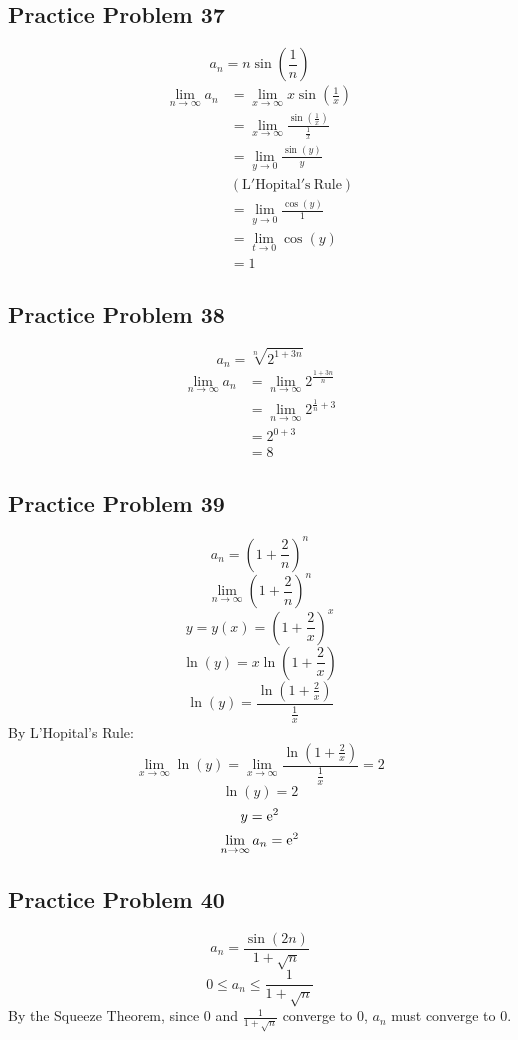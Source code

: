 \documentclass{math}
\begin{document}
\subsection*{Practice Problem 37}
\[ a_{n} = n\sin(\frac{1}{n}) \]
\begin{align*}
  \lim_{n\to\infty}{a_{n}} &= \lim_{x\to\infty}{x\sin(\frac{1}{x})} \\
  &= \lim_{x\to\infty}{\frac{\sin(\frac{1}{x})}{\frac{1}{x}}} \\
  &= \lim_{y\to0}{\frac{\sin(y)}{y}} \\
  & \mathrm{(L'Hopital's\ Rule)} \\
  &= \lim_{y\to0}{\frac{\cos(y)}{1}} \\
  &= \lim_{t\to0}{\cos(y)} \\
  &= 1
\end{align*}

\subsection*{Practice Problem 38}
\[ a_{n} = \sqrt[n]{2^{1+3n}} \]
\begin{align*}
  \lim_{n\to\infty}{a_{n}} &= \lim_{n\to\infty}{2^{\frac{1+3n}{n}}} \\
  &= \lim_{n\to\infty}{2^{\frac{1}{n}+3}} \\
  &= 2^{0+3} \\
  &= 8
\end{align*}

\subsection*{Practice Problem 39}
\[ a_{n} = (1+\frac{2}{n})^{n} \]
\[ \lim_{n\to\infty}{(1+\frac{2}{n})^{n}} \]
\[ y = y(x) = (1+\frac{2}{x})^{x} \]
\[ \ln(y) = x\ln(1+\frac{2}{x}) \]
\[ \ln(y) = \frac{\ln(1+\frac{2}{x})}{\frac{1}{x}} \]
By L'Hopital's Rule:
\[ \lim_{x\to\infty}{\ln(y)} =
   \lim_{x\to\infty}{\frac{\ln(1+\frac{2}{x})}{\frac{1}{x}}} = 2 \]
\[ \ln(y) = 2 \]
\[ y = \mathrm{e}^{2} \]
\[ \lim_{n\to\infty}{a_{n}} = \mathrm{e}^{2} \]

\subsection*{Practice Problem 40}
\[ a_{n} = \frac{\sin(2n)}{1+\sqrt{n}} \]
\[ 0 \leq a_{n} \leq \frac{1}{1+\sqrt{n}} \]
By the Squeeze Theorem, since 0 and \( \frac{1}{1+\sqrt{n}} \) converge to 0,
\( a_{n} \) must converge to 0.
\end{document}
